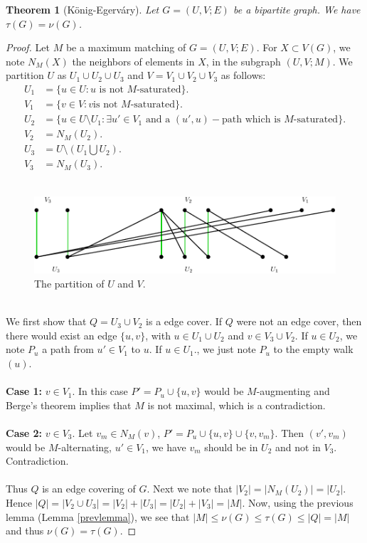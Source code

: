 \documentclass[12pt,a4paper]{article}
\newtheorem{thm}{Theorem}[section]
\theoremstyle{definition}
\begin{document}
\begin{thm}[König-Egerváry] Let $G=(U,V;E)$ be a bipartite graph. We have $\tau(G)=\nu(G)$. 
\end{thm}
\begin{proof}
Let $M$ be a maximum matching of $G=(U,V;E)$. For $X \subset V(G)$, we note $N_M(X)$ the neighbors of elements in $X$, in the subgraph $(U,V;M)$. We partition $U$ as $U_1 \cup U_2 \cup U_3$ and $V=V_1 \cup V_2 \cup V_3$ as follows: 
\begin{align*}
U_1 &= \{u \in U : u \text{ is not } M\text{-saturated}\}. \\
V_1 &= \{v \in V : v \text{is not } M\text{-saturated}\}. \\
U_2 &=\{ u \in U \setminus U_1 : \exists u' \in V_1 \text{ and a } (u',u)-\text{path which is $M$-saturated}\}. \\
V_2 &= N_M(U_2). \\
U_3 &= U \setminus (U_1 \bigcup U_2). \\
V_3 & = N_M(U_3). 
\end{align*}
\
\begin{figure}[hbtp]
\centering
\includegraphics[scale=.85]{images/graph46.pdf}
\caption{The partition of $U$ and $V$.}
\end{figure}
\\
We first show that $Q=U_3 \cup V_2$ is a edge cover. If $Q$ were not an edge cover, then there would exist an edge $\{u,v\}$, with $u \in U_1 \cup U_2$ and $v \in V_3 \cup V_2$.  If $u \in U_2$, we note $P_u$ a path from $u' \in V_1$ to $u$. If $u \in U_1$., we just note $P_u$ to the empty walk $(u)$. 
\\\\
\textbf{Case 1:} $v \in V_1$. In this case $P'=P_u \cup \{u,v\}$ would be $M$-augmenting and Berge's theorem implies that $M$ is not maximal, which is a contradiction.
\\\\
\textbf{Case 2:} $v \in V_3$. Let $v_m \in N_M(v)$, $P'= P_u \cup \{u,v\} \cup \{v,v_m\}$. Then $(v',v_m)$ would be $M$-alternating, $u' \in V_1$, we have $v_m$ should be in $U_2$ and not in $V_3$. Contradiction. 
\\\\
Thus $Q$ is an edge covering of $G$. Next we note that $|V_2| = |N_M(U_2)|=|U_2|$. Hence $|Q|=|V_2 \cup U_3| = |V_2| + |U_3| = |U_2| + |V_3|=|M|.$ Now, using the previous lemma (Lemma \ref{prevlemma}), we see that $|M| \leq \nu(G) \leq \tau(G) \leq |Q|= |M|$ and thus $\nu(G)= \tau(G)$. 
\end{proof}
\end{document}
